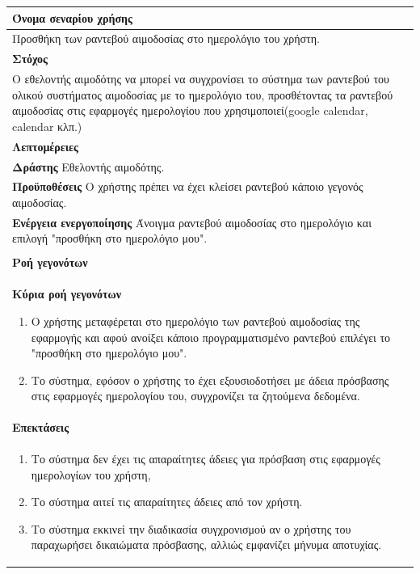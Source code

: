 \begin{center}
    \begin{tabular}{|p{\dimexpr \linewidth-2\tabcolsep}|}
    \hline
    \rowcolor{grayy}
    \textbf{Όνομα σεναρίου χρήσης}
    \\ \hline    
    Προσθήκη των ραντεβού αιμοδοσίας στο ημερολόγιο του χρήστη.
     \\ \hline
    \rowcolor{grayy}
    \textbf{\textbf{Στόχος}}
    \\ \hline
 	 Ο εθελοντής αιμοδότης να μπορεί να συγχρονίσει το σύστημα των ραντεβού του ολικού συστήματος αιμοδοσίας με το ημερολόγιο του, προσθέτοντας τα  ραντεβού αιμοδοσίας στις εφαρμογές ημερολογίου που χρησιμοποιεί(google calendar, calendar κλπ.)
    \\ \hline
    \rowcolor{grayy}
    \textbf{Λεπτομέρειες}
    \\ \hline
	\textbf{Δράστης} Εθελοντής αιμοδότης.
	\\*
	\textbf{Προϋποθέσεις} Ο χρήστης πρέπει να έχει κλείσει ραντεβού κάποιο γεγονός αιμοδοσίας.
	\\*
	\textbf{Ενέργεια ενεργοποίησης} Άνοιγμα ραντεβού αιμοδοσίας  στο ημερολόγιο και επιλογή "προσθήκη στο ημερολόγιο μου".
	\\ \hline
    \\ \hline
	\rowcolor{grayy}    
    \textbf{Ροή γεγονότων}
    \\* 
	\textbf{Κύρια ροή γεγονότων}
	\begin{enumerate}
	\item	 Ο χρήστης μεταφέρεται στο ημερολόγιο των ραντεβού αιμοδοσίας της εφαρμογής και αφού ανοίξει κάποιο προγραμματισμένο ραντεβού επιλέγει το "προσθήκη στο ημερολόγιο μου".
	\item  Το σύστημα, εφόσον ο χρήστης το έχει εξουσιοδοτήσει με άδεια πρόσβασης στις εφαρμογές ημερολογίου του, συγχρονίζει τα ζητούμενα δεδομένα.
	\end{enumerate}
	\\*
	\textbf{Επεκτάσεις}
	   \\ \hline
	   \begin{enumerate}
	\item Το σύστημα δεν έχει τις απαραίτητες άδειες για πρόσβαση στις εφαρμογές ημερολογίων του χρήστη,
	\item Το σύστημα αιτεί τις απαραίτητες άδειες από τον χρήστη.
	\item Το σύστημα εκκινεί την διαδικασία συγχρονισμού αν ο χρήστης του παραχωρήσει δικαιώματα πρόσβασης, αλλιώς εμφανίζει μήνυμα αποτυχίας.
	\end{enumerate}
	\\ \hline
    \end{tabular}
\end{center}	
		
